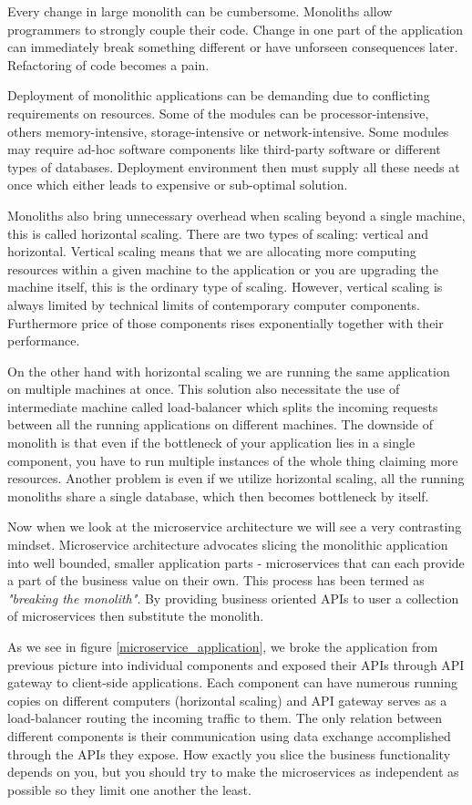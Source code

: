 \documentclass[12pt,oneside]{fithesis2}
\begin{document}
Every change in large monolith can be cumbersome. Monoliths allow programmers to strongly couple their code. Change in one part of the application can immediately break something different or have unforseen consequences later. Refactoring of code becomes a pain.

Deployment of monolithic applications can be demanding due to conflicting  requirements on resources. Some of the modules can be processor-intensive, others memory-intensive, storage-intensive or network-intensive. Some modules may require ad-hoc software components like third-party software or different types of databases. Deployment environment then must supply all these needs at once which either leads to expensive or sub-optimal solution.

Monoliths also bring unnecessary overhead when scaling beyond a single machine, this is called horizontal scaling. There are two types of scaling: vertical and horizontal. Vertical scaling means that we are allocating more computing resources within a given machine to the application or you are upgrading the machine itself, this is the ordinary type of scaling. However, vertical scaling is always limited by technical limits of contemporary computer components. Furthermore price of those components rises exponentially together with their performance.

On the other hand with horizontal scaling we are running the same application on multiple machines at once. This solution also necessitate the use of intermediate machine called load-balancer which splits the incoming requests between all the running applications on different machines. The downside of monolith is that even if the bottleneck of your application lies in a single component, you have to run multiple instances of the whole thing claiming more resources. Another problem is even if we utilize horizontal scaling, all the running monoliths share a single database, which then becomes bottleneck by itself.

Now when we look at the microservice architecture we will see a very contrasting mindset. Microservice architecture advocates slicing the monolithic application into well bounded, smaller application parts - microservices that can each provide a part of the business value on their own. This process has been termed as \textit{"breaking the monolith"}. By providing business oriented APIs to user a collection of microservices then substitute the monolith.

As we see in figure \ref{microservice_application}, we broke the application from previous picture into individual components and exposed their APIs through API gateway to client-side applications. Each component can have numerous running copies on different computers (horizontal scaling) and API gateway serves as a load-balancer routing the incoming traffic to them. The only relation between different components is their communication using data exchange accomplished through the APIs they expose. How exactly you slice the business functionality depends on you, but you should try to make the microservices as independent as possible so they limit one another the least.
\end{document}
